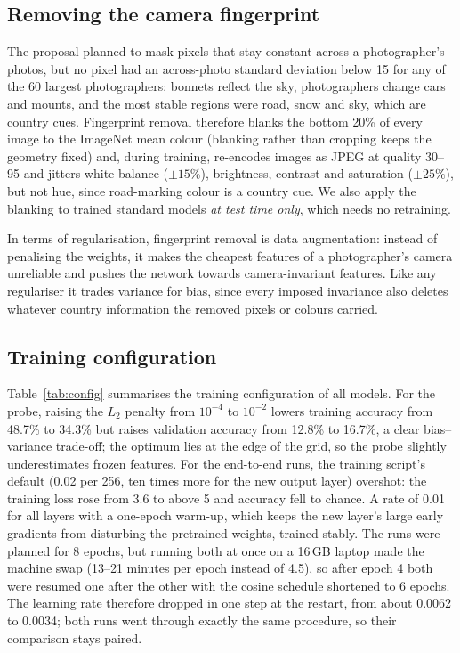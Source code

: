 \documentclass[11pt]{article}
\begin{document}
\subsection{Removing the camera fingerprint}\label{sec:fpmethod}
The proposal planned to mask pixels that stay constant across a photographer's photos, but no pixel had
an across-photo standard deviation below 15 for any of the 60 largest photographers: bonnets reflect the
sky, photographers change cars and mounts, and the most stable regions were road, snow and sky, which are
country cues. Fingerprint removal therefore blanks the bottom 20\% of every image to the ImageNet mean
colour (blanking rather than cropping keeps the geometry fixed) and, during training, re-encodes images
as JPEG at quality 30--95 and jitters white balance ($\pm15\%$), brightness, contrast and saturation
($\pm25\%$), but not hue, since road-marking colour is a country cue. We also apply the blanking to
trained standard models \emph{at test time only}, which needs no retraining.

In terms of regularisation, fingerprint removal is data augmentation: instead of penalising the weights,
it makes the cheapest features of a photographer's camera unreliable and pushes the network towards
camera-invariant features. Like any regulariser it trades variance for bias, since every imposed
invariance also deletes whatever country information the removed pixels or colours carried.

\subsection{Training configuration}\label{sec:config}
Table~\ref{tab:config} summarises the training configuration of all models.
For the probe, raising the $L_2$ penalty from $10^{-4}$ to $10^{-2}$ lowers training accuracy from 48.7\%
to 34.3\% but raises validation accuracy from 12.8\% to 16.7\%, a clear bias--variance trade-off; the
optimum lies at the edge of the grid, so the probe slightly underestimates frozen features. For the
end-to-end runs, the training script's default (0.02 per 256, ten times more for the new output layer) overshot: the training loss rose from 3.6 to above 5 and accuracy fell to chance. A rate of 0.01 for all layers with a one-epoch warm-up, which keeps the new layer's large early gradients from disturbing the pretrained weights, trained stably. The
runs were planned for 8 epochs, but running both at once on a 16\,GB laptop made the machine swap (13--21
minutes per epoch instead of 4.5), so after epoch 4 both were resumed one after the other with the cosine
schedule shortened to 6 epochs. The learning rate therefore dropped in one step at the restart, from about
0.0062 to 0.0034; both runs went through exactly the same procedure, so their comparison stays paired.
\end{document}
